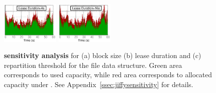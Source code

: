 \begin{figure}[t]
{    \includegraphics[width = 0.25\textwidth]{fig/jiffy/lease_duration_4}\hspace{-.5em}%
    \includegraphics[width = 0.25\textwidth]{fig/jiffy/lease_duration_16}\hspace{-.5em}%
    \label{fig:lease-duration}
  }
  \caption[\jiffy sensitivity analysis]{\textbf{\jiffy sensitivity analysis} for (a) block size (b) lease duration and (c) repartition threshold for the file data structure. Green area corresponds to used capacity, while red area corresponds to allocated capacity under \jiffy. See Appendix~\ref{ssec:jiffysensitivity} for details.}
\end{figure}


